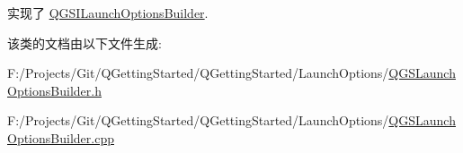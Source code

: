 实现了 \mbox{\hyperlink{class_q_g_s_i_launch_options_builder_aa789a60c4b15f5ba900046eed709de2f}{Q\+G\+S\+I\+Launch\+Options\+Builder}}.



该类的文档由以下文件生成\+:\begin{DoxyCompactItemize}
\item 
F\+:/\+Projects/\+Git/\+Q\+Getting\+Started/\+Q\+Getting\+Started/\+Launch\+Options/\mbox{\hyperlink{_q_g_s_launch_options_builder_8h}{Q\+G\+S\+Launch\+Options\+Builder.\+h}}\item 
F\+:/\+Projects/\+Git/\+Q\+Getting\+Started/\+Q\+Getting\+Started/\+Launch\+Options/\mbox{\hyperlink{_q_g_s_launch_options_builder_8cpp}{Q\+G\+S\+Launch\+Options\+Builder.\+cpp}}\end{DoxyCompactItemize}
